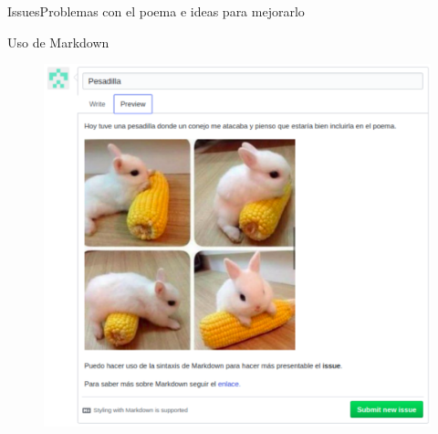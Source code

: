 \documentclass[10pt]{beamer}
\begin{document}
\begin{frame}{Issues}{Problemas con el poema e ideas para mejorarlo}

\begin{block}{Uso de Markdown}
\begin{figure}[h!]
\centering
\includegraphics [scale=0.4]{styling}
\label{fig:styling}
\end{figure}
    
\end{block}

\end{frame}
\end{document}
